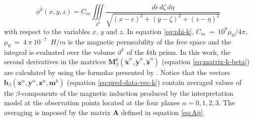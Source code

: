 \documentclass[draft,gc]{agutex}
\begin{document}
\begin{article}
\begin{equation}
\phi^{k}(x, y, z) = 
    C_{m}
    \iiint\limits_{\vartheta^{k}}
    \frac{d\epsilon \, d\zeta \, d\eta}
         {\sqrt{(x - \epsilon)^{2} +
                (y - \zeta)^{2} +
                (z - \eta)^{2}}}
\label{eq:phi-k}
\end{equation}
with respect to the variables $x$, $y$ and $z$.
In equation \ref{eq:phi-k},
$C_{m}~=~10^{9}\mu_{0}/4\pi$, $\mu_{0}~=~4~\pi~10^{-7}$~$H/m$ is the 
magnetic permeability of the free space
and the integral is evaluated over the 
volume $\vartheta^{k}$ of the $k$th prism. 
In this work, the second derivatives in the matrices
$\mathbf{M}_{\beta}^{k}(\tilde{\mathbf{x}}^{\alpha}, 
\tilde{\mathbf{y}}^{\alpha}, \tilde{\mathbf{z}}^{\alpha})$ 
(equation \ref{eq:matrix-k-beta}) are calculated by using the formulas 
presented by \citet{nagy2000}.
Notice that the vectors $\mathbf{b}_{\beta}(\mathbf{x}^{\alpha},
\mathbf{y}^{\alpha}, \mathbf{z}^{\alpha}, \mathbf{m}^{k})$
(equation \ref{eq:pred-data-vec-k}) contain averaged values of
the $\beta$-components of the magnetic induction produced by
the interpretation model at the observation points located at
the four planes $\alpha = 0, 1, 2, 3$. The averaging is imposed
by the matrix $\mathbf{A}$ defined in equation \ref{eq:Aij}.


\end{article}
\end{document}
